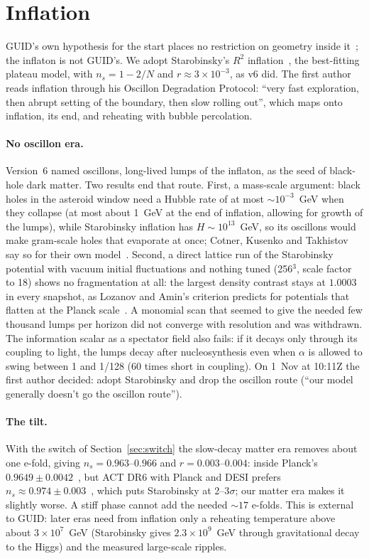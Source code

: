 \documentclass[11pt,a4paper]{article}
\begin{document}
\section{Inflation}\label{sec:inflation}

GUID's own hypothesis for the start places no restriction on geometry inside it~\cite{guidv6}; the inflaton is not GUID's. We adopt
Starobinsky's $R^2$ inflation~\cite{starobinsky}, the best-fitting plateau model, with $n_s=1-2/N$ and $r\approx3\times10^{-3}$, as v6 did.
The first author reads inflation through his Oscillon Degradation Protocol: ``very fast exploration, then abrupt setting of the boundary,
then slow rolling out'', which maps onto inflation, its end, and reheating with bubble percolation.

\paragraph{No oscillon era.} Version~6 named oscillons, long-lived lumps of the inflaton, as the seed of black-hole dark matter. Two results
end that route. First, a mass-scale argument: black holes in the asteroid window need a Hubble rate of at most $\sim10^{-3}$~GeV when they collapse
(at most about 1~GeV at the end of inflation, allowing for growth of the lumps), while Starobinsky inflation has $H\sim10^{13}$~GeV, so its oscillons would make gram-scale holes that evaporate at once; Cotner, Kusenko and
Takhistov say so for their own model~\cite{cotner2018}. Second, a direct lattice run of the Starobinsky potential with vacuum initial
fluctuations and nothing tuned (256$^3$, scale factor to 18) shows no fragmentation at all: the largest density contrast stays at
$1.0003$ in every snapshot, as Lozanov and Amin's criterion predicts for potentials that flatten at the Planck scale~\cite{lozanov}. A
monomial scan that seemed to give the needed few thousand lumps per horizon did not converge with resolution and was withdrawn. The
information scalar as a spectator field also fails: if it decays only through its coupling to light, the lumps decay after nucleosynthesis
even when $\alpha$ is allowed to swing between 1 and 1/128 (60 times short in coupling). On 1~Nov at 10:11Z the first author decided:
adopt Starobinsky and drop the oscillon route (``our model generally doesn't go the oscillon route'').

\paragraph{The tilt.} With the switch of Section~\ref{sec:switch} the slow-decay matter era removes about one e-fold, giving
$n_s=0.963$--$0.966$ and $r=0.003$--$0.004$: inside Planck's $0.9649\pm0.0042$~\cite{planck}, but ACT DR6 with Planck and DESI prefers
$n_s\approx0.974\pm0.003$~\cite{act}, which puts Starobinsky at 2--3$\sigma$; our matter era makes it slightly worse. A stiff phase cannot add
the needed $\sim17$ e-folds. This is external to GUID: later eras need from inflation only a reheating temperature above about
$3\times10^7$~GeV (Starobinsky gives $2.3\times10^9$~GeV through gravitational decay to the Higgs) and the measured large-scale ripples.
\end{document}
